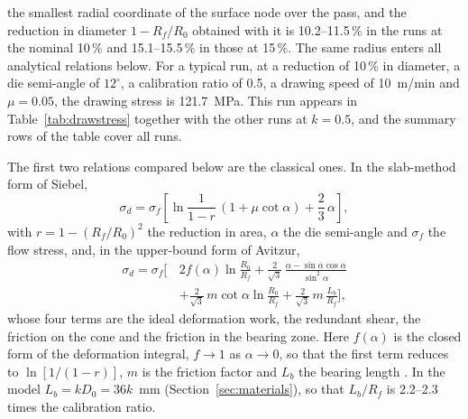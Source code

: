 \documentclass[subscriptcorrection,upint,varvw,barcolor=Goldenrod3,mathalfa=cal=euler,balance,hyphenate,french,pdf-a]{asmejour} %
\begin{document}
the smallest radial coordinate of the surface node over the pass, and the reduction in diameter
$1-R_f/R_0$ obtained with it is 10.2--11.5\,\% in the runs at the nominal 10\,\% and 15.1--15.5\,\%
in those at 15\,\%. The same radius enters all analytical relations below.
For a typical run, at a reduction of 10\,\% in
diameter, a die semi-angle of $12^\circ$, a calibration ratio of 0.5, a drawing speed of 10~m/min and
$\mu = 0.05$, the drawing stress is 121.7~MPa. This run appears in Table~\ref{tab:drawstress}
together with the other runs at $k = 0.5$, and the summary rows of the table cover all runs.

The first two relations compared below are the classical ones. In the slab-method form of Siebel,
\begin{equation}
\sigma_d = \sigma_f\left[\ln\frac{1}{1-r}\,(1+\mu\cot\alpha) + \frac{2}{3}\,\alpha\right],
\label{eq:siebel}
\end{equation}
with $r = 1-(R_f/R_0)^2$ the reduction in area, $\alpha$ the die semi-angle and $\sigma_f$ the flow
stress, and, in the upper-bound form of Avitzur,
\begin{equation}
\begin{split}
\sigma_d = \sigma_f\biggl[\,&2f(\alpha)\ln\frac{R_0}{R_f}
  + \frac{2}{\sqrt3}\,\frac{\alpha-\sin\alpha\cos\alpha}{\sin^2\alpha}\\
  &+ \frac{2}{\sqrt3}\,m\cot\alpha\ln\frac{R_0}{R_f}
  + \frac{2}{\sqrt3}\,m\,\frac{L_b}{R_f}\biggr],
\end{split}
\label{eq:avitzur}
\end{equation}
whose four terms are the ideal deformation work, the redundant shear, the friction on the cone and
the friction in the bearing zone. Here $f(\alpha)$ is the closed form of the deformation integral,
$f\to1$ as $\alpha\to0$, so that the first
term reduces to $\ln[1/(1-r)]$, $m$ is the friction factor and $L_b$ the bearing length
\citep{siebel1947drahtziehen,avitzur1968metal,avitzur1971study}. In the model
$L_b = kD_0 = 36k$~mm (Section~\ref{sec:materials}), so that $L_b/R_f$ is 2.2--2.3 times the
calibration ratio.
\end{document}
